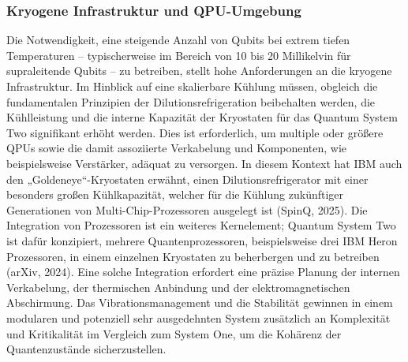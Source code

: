 \subsubsection{Kryogene Infrastruktur und QPU-Umgebung}
Die Notwendigkeit, eine steigende Anzahl von Qubits bei extrem tiefen Temperaturen – typischerweise im Bereich von 10 bis 20 Millikelvin für supraleitende Qubits – zu betreiben, stellt hohe Anforderungen an die kryogene Infrastruktur. Im Hinblick auf eine skalierbare Kühlung müssen, obgleich die fundamentalen Prinzipien der Dilutionsrefrigeration beibehalten werden, die Kühlleistung und die interne Kapazität der Kryostaten für das Quantum System Two signifikant erhöht werden. Dies ist erforderlich, um multiple oder größere QPUs sowie die damit assoziierte Verkabelung und Komponenten, wie beispielsweise Verstärker, adäquat zu versorgen. In diesem Kontext hat IBM auch den „Goldeneye“-Kryostaten erwähnt, einen Dilutionsrefrigerator mit einer besonders großen Kühlkapazität, welcher für die Kühlung zukünftiger Generationen von Multi-Chip-Prozessoren ausgelegt ist (SpinQ, 2025). Die Integration von Prozessoren ist ein weiteres Kernelement; Quantum System Two ist dafür konzipiert, mehrere Quantenprozessoren, beispielsweise drei IBM Heron Prozessoren, in einem einzelnen Kryostaten zu beherbergen und zu betreiben (arXiv, 2024). Eine solche Integration erfordert eine präzise Planung der internen Verkabelung, der thermischen Anbindung und der elektromagnetischen Abschirmung. Das Vibrationsmanagement und die Stabilität gewinnen in einem modularen und potenziell sehr ausgedehnten System zusätzlich an Komplexität und Kritikalität im Vergleich zum System One, um die Kohärenz der Quantenzustände sicherzustellen.




